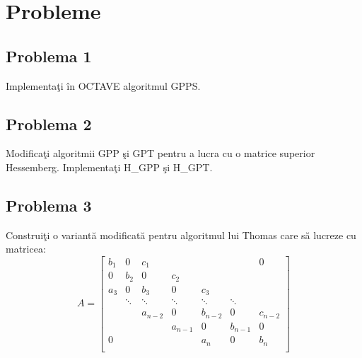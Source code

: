 \documentclass{exam}
\begin{document}

\section{Probleme}

\subsection{Problema 1}
Implementa\c{t}i \^{i}n OCTAVE algoritmul GPPS.

\subsection{Problema 2}
Modifica\c{t}i algoritmii GPP \c{s}i GPT pentru a lucra cu o matrice superior Hessemberg. Implementa\c{t}i H\_GPP \c{s}i H\_GPT.

\subsection{Problema 3}
Construi\c{t}i o variant\u{a} modificat\u{a} pentru algoritmul lui Thomas care s\u{a} lucreze cu matricea:
\[
	A = \begin{bmatrix}
		{b_1} & { 0 }  & {c_1}      & {   }      & {   }     & {   }     & { 0 }     \\
		{ 0 } & {b_2}  & { 0 }      & {c_2}      & {   }     & {   }     & {   }     \\
		{a_3} & { 0 }  & {b_3}      & { 0 }      & {c_3}     & {   }     & {   }     \\
		{   } & \ddots & \ddots     & \ddots     & \ddots    & \ddots    & {   }     \\
		{   } & {   }  & { a_{n-2}} & { 0 }      & {b_{n-2}} & { 0 }     & {c_{n-2}} \\
		{   } & {   }  & {   }      & { a_{n-1}} & { 0 }     & {b_{n-1}} & { 0 }     \\
		{ 0 } & {   }  & {   }      & {   }      & {a_n}     & { 0 }     & {b_n}     \\
	\end{bmatrix}
\]
\end{document}
